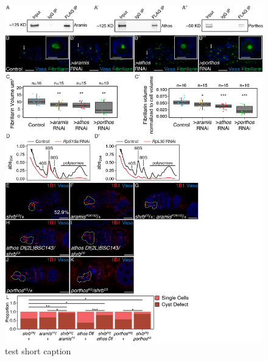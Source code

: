\documentclass[12pt,oneside]{reedthesis}
\begin{document}
\begin{figure}

{\centering \includegraphics[width=6.5 in,height=8.9375 in]{./figure/Ribosome Biogenesis/Ribosome Biogenesis 2S} 

}

\caption[test short caption]{test short caption}\label{fig:unnamed-chunk-9}
\end{figure}
\end{document}
